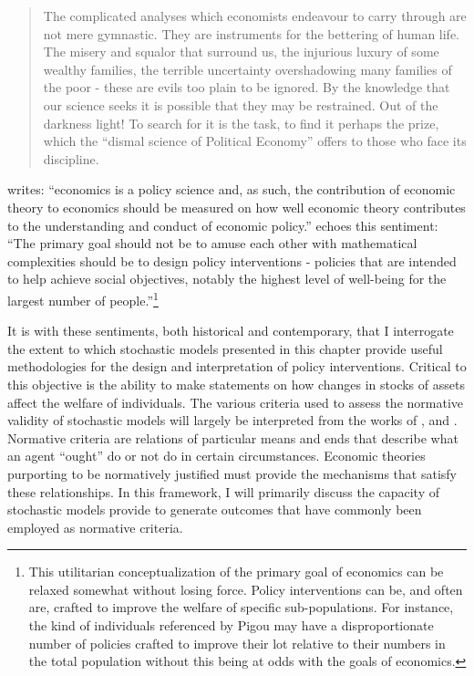 \documentclass[../main.tex]{subfiles}
\begin{document}
\singlespacing
\blockquote{
The complicated analyses which economists endeavour to carry through are not mere gymnastic.
They are instruments for the bettering of human life.
The misery and squalor that surround us, the injurious luxury of some wealthy families, the terrible uncertainty overshadowing many families of the poor - these are evils too plain to be ignored.
By the knowledge that our science seeks it is possible that they may be restrained.
Out of the darkness light!
To search for it is the task, to find it perhaps the prize, which the \enquote{dismal science of Political Economy} offers to those who face its discipline.
}
\doublespacing

\noindent \textcite[238]{Varian1996} writes: \enquote{economics is a policy science and, as such, the contribution of economic theory to economics should be measured on how well economic theory contributes to the understanding and conduct of economic policy.}
\textcite[30]{Leamer2012} echoes this sentiment:
\enquote{The primary goal  should not be to amuse each other with mathematical complexities \textelp{}  should be to design policy interventions - policies that are intended to help achieve social objectives, notably the highest level of well-being for the largest number of people.}\footnote{
	This utilitarian conceptualization of the primary goal of economics can be relaxed somewhat without losing force.
	Policy interventions can be, and often are, crafted to improve the welfare of specific sub-populations.
	For instance, the kind of individuals referenced by Pigou may have a disproportionate number of policies crafted to improve their lot relative to their numbers in the total population without this being at odds with the goals of economics.
}

It is with these sentiments, both historical and contemporary, that I interrogate the extent to which stochastic models presented in this chapter provide useful methodologies for the design and interpretation of policy interventions.
Critical to this objective is the ability to make statements on how changes in stocks of assets affect the welfare of individuals.
The various criteria used to assess the normative validity of stochastic models will largely be interpreted from the works of \textcite{Grune-Yanoff2014}, \textcite{Berg2014} and \textcite{Hands2014}.
Normative criteria are relations of particular means and ends that describe what an agent \enquote{ought} do or not do in certain circumstances.
Economic theories purporting to be normatively justified must provide the mechanisms that satisfy these relationships.
In this framework, I will primarily discuss the capacity of stochastic models provide to generate outcomes that have commonly been employed as normative criteria.
\end{document}
